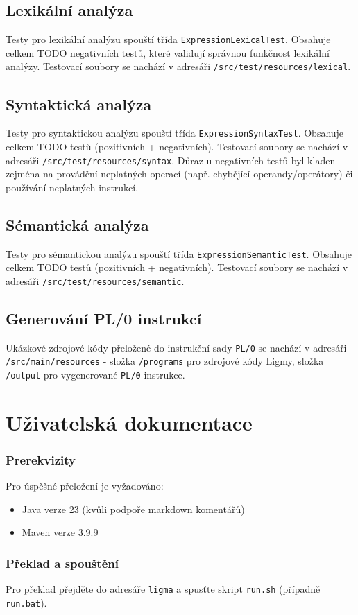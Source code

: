 \documentclass[czech, oth, kiv, he, iso690numb, viewonly]{fasthesis}
\begin{document}
\section{Lexikální analýza}
Testy pro lexikální analýzu spouští třída \texttt{ExpressionLexicalTest}. Obsahuje celkem TODO negativních testů, které validují správnou funkčnost
lexikální analýzy. Testovací soubory se nachází v adresáři \texttt{/src/test/resources/lexical}.
\section{Syntaktická analýza}
Testy pro syntaktickou analýzu spouští třída \texttt{ExpressionSyntaxTest}. Obsahuje celkem TODO testů (pozitivních + negativních). Testovací
soubory se nachází v adresáři \texttt{/src/test/resources/syntax}. Důraz u negativních testů byl kladen zejména na provádění neplatných operací 
(např. chybějící operandy/operátory) či používání neplatných instrukcí. 
\section{Sémantická analýza}
Testy pro sémantickou analýzu spouští třída \texttt{ExpressionSemanticTest}. Obsahuje celkem TODO testů (pozitivních + negativních).
Testovací soubory se nachází v adresáři \texttt{/src/test/resources/semantic}.
\section{Generování PL/0 instrukcí}
Ukázkové zdrojové kódy přeložené do instrukční sady \texttt{PL/0} se nachází v adresáři \texttt{/src/main/resources} - složka \texttt{/programs}
pro zdrojové kódy Ligmy, složka \texttt{/output} pro vygenerované \texttt{PL/0} instrukce.

\chapter{Uživatelská dokumentace}
\subsection{Prerekvizity}
Pro úspěšné přeložení je vyžadováno:
\begin{itemize}
    \item Java verze 23 (kvůli podpoře markdown komentářů)
    \item Maven verze 3.9.9
\end{itemize}

\subsection{Překlad a spouštění}
Pro překlad přejděte do adresáře \texttt{ligma} a spusťte skript \texttt{run.sh} (případně \texttt{run.bat}).
\end{document}
